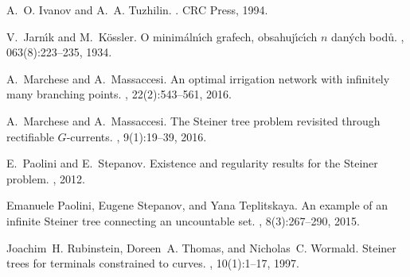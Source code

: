 \documentclass{amsart}
\theoremstyle{definition}
\theoremstyle{remark}
\begin{document}
\begin{thebibliography}{10}
  A.~O. Ivanov and A.~A. Tuzhilin.
  .
  \newblock CRC Press, 1994.
  
  V.~Jarn\'\i{}k and M.~K\"o{}ssler.
  \newblock O minim\'a{}ln\'\i{}ch grafech, obsahuj\'\i{}c\'\i{}ch $n$ dan\'y{}ch bod\r u{}.
  , 063(8):223--235, 1934.
  
  A.~Marchese and A.~Massaccesi.
  \newblock An optimal irrigation network with infinitely many branching points.
  , 22(2):543--561, 2016.
  
  A.~Marchese and A.~Massaccesi.
  \newblock The {S}teiner tree problem revisited through rectifiable {$G$}-currents.
  , 9(1):19--39, 2016.
  
  E.~Paolini and E.~Stepanov.
  \newblock Existence and regularity results for the {S}teiner problem.
  , 2012.
  
  Emanuele Paolini, Eugene Stepanov, and Yana Teplitskaya.
  \newblock An example of an infinite {S}teiner tree connecting an uncountable set.
  , 8(3):267--290, 2015.
  
  Joachim~H. Rubinstein, Doreen~A. Thomas, and Nicholas~C. Wormald.
  \newblock Steiner trees for terminals constrained to curves.
  , 10(1):1--17, 1997.
  
  \end{thebibliography}  
\end{document}
